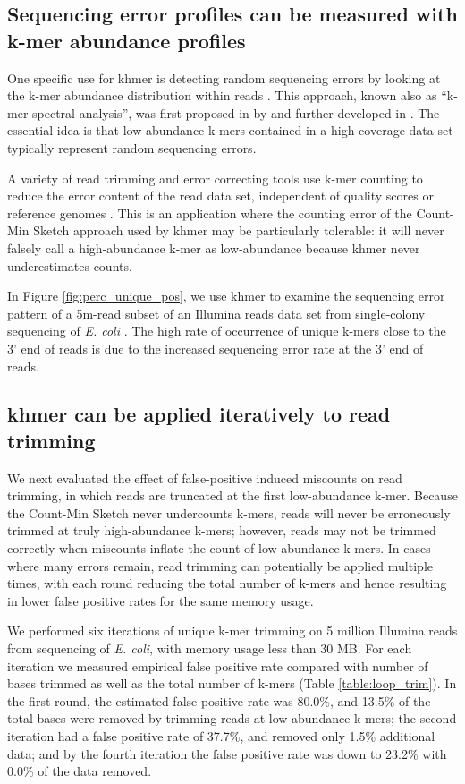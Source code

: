 \subsection{Sequencing error profiles can be measured with k-mer abundance
profiles}

One specific use for khmer is detecting random sequencing errors by
looking at the k-mer abundance distribution within reads
\cite{Medvedev2011}.  This approach, known also as ``k-mer spectral
analysis'', was first proposed in by \cite{Pevzner2001} and further
developed in \cite{Li2003}.  The essential idea is that low-abundance
k-mers contained in a high-coverage data set typically represent
random sequencing errors.

A variety of read trimming and error correcting tools use k-mer
counting to reduce the error content of the read data set, independent
of quality scores or reference genomes \cite{Kelley2010}.  This is an
application where the counting error of the Count-Min Sketch approach
used by khmer may be particularly tolerable: it will never falsely
call a high-abundance k-mer as low-abundance because khmer never
underestimates counts.

In Figure \ref{fig:perc_unique_pos}, we use khmer to examine the
sequencing error pattern of a 5m-read subset of an Illumina reads data
set from single-colony sequencing of {\em E. coli}
\cite{pubmed21926975}.  The high rate of occurrence of unique k-mers
close to the 3' end of reads is due to the increased sequencing error
rate at the 3' end of reads.

\subsection{khmer can be applied iteratively to read trimming}

We next evaluated the effect of false-positive induced miscounts on
read trimming, in which reads are truncated at the first low-abundance
k-mer.  Because the Count-Min Sketch never undercounts k-mers, reads
will never be erroneously trimmed at truly high-abundance k-mers;
however, reads may not be trimmed correctly when miscounts inflate the
count of low-abundance k-mers.  In cases where many errors remain,
read trimming can potentially be applied multiple times, with each
round reducing the total number of k-mers and hence resulting in lower
false positive rates for the same memory usage.

We performed six iterations of unique k-mer trimming on 5 million
Illumina reads from sequencing of {\em E. coli}, with memory
usage less than 30 MB.  For each iteration we measured empirical false
positive rate compared with number of bases trimmed as well as the
total number of k-mers (Table \ref{table:loop_trim}).  In the first
round, the estimated false positive rate was 80.0\%, and 13.5\% of the
total bases were removed by trimming reads at low-abundance k-mers;
the second iteration had a false positive rate of 37.7\%, and removed
only 1.5\% additional data; and by the fourth iteration the false
positive rate was down to 23.2\% with 0.0\% of the data removed.

